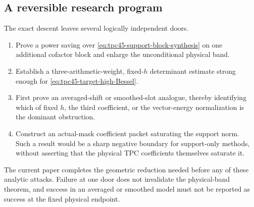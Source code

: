 \subsection{A reversible research program}

The exact descent leaves several logically independent doors.
\begin{enumerate}[label=\textbf{Door \Alph*.},leftmargin=3.7em]
 \item Prove a power saving over
 \eqref{eq:tpc45-support-block-synthesis} on one additional cofactor
 block and enlarge the unconditional physical band.
 \item Establish a three-arithmetic-weight, fixed-\(h\) determinant
 estimate strong enough for \eqref{eq:tpc45-target-high-Bessel}.
 \item First prove an averaged-shift or smoothed-slot analogue, thereby
 identifying which of fixed \(h\), the third coefficient, or the
 vector-energy normalization is the dominant obstruction.
 \item Construct an actual-mask coefficient packet saturating the
 support norm.  Such a result would be a sharp negative boundary for
 support-only methods, without asserting that the physical TPC
 coefficients themselves saturate it.
\end{enumerate}
The current paper completes the geometric reduction needed before any
of these analytic attacks.  Failure at one door does not invalidate the
physical-band theorem, and success in an averaged or smoothed model
must not be reported as success at the fixed physical endpoint.
